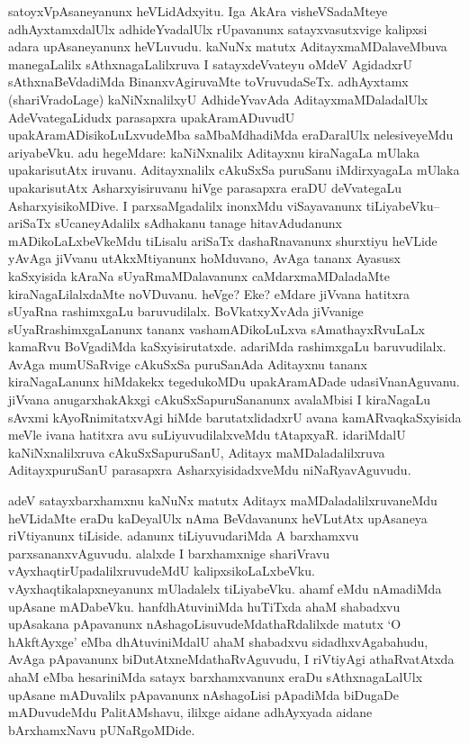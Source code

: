 \begin{artha}
satoyxVpAsaneyanunx heVLidAdxyitu. Iga AkAra visheVSadaMteye adhAyxtamxdalUlx adhideYvadalUlx rUpavanunx satayxvasutxvige kalipxsi adara upAsaneyanunx heVLuvudu. kaNuNx matutx AditayxmaMDalaveMbuva manegaLalilx sAthxnagaLalilxruva I satayxdeVvateyu oMdeV AgidadxrU sAthxnaBeVdadiMda BinanxvAgiruvaMte toVruvudaSeTx. adhAyxtamx (shariVradoLage) kaNiNxnalilxyU AdhideYvavAda AditayxmaMDaladalUlx AdeVvategaLidudx parasapxra upakAramADuvudU upakAramADisikoLuLxvudeMba saMbaMdhadiMda eraDaralUlx nelesiveyeMdu ariyabeVku. adu hegeMdare: kaNiNxnalilx Aditayxnu kiraNagaLa mUlaka upakarisutAtx iruvanu. Aditayxnalilx cAkuSxSa puruSanu iMdirxyagaLa mUlaka upakarisutAtx Asharxyisiruvanu hiVge parasapxra eraDU deVvategaLu AsharxyisikoMDive. I parxsaMgadalilx inonxMdu viSayavanunx tiLiyabeVku-- ariSaTx sUcaneyAdalilx sAdhakanu tanage hitavAdudanunx mADikoLaLxbeVkeMdu tiLisalu ariSaTx dashaRnavanunx shurxtiyu heVLide yAvAga jiVvanu utAkxMtiyanunx hoMduvano, AvAga tananx Ayasusx kaSxyisida kAraNa sUyaRmaMDalavanunx caMdarxmaMDaladaMte kiraNagaLilalxdaMte noVDuvanu. heVge? Eke? eMdare jiVvana hatitxra sUyaRna rashimxgaLu baruvudilalx. BoVkatxyXvAda jiVvanige sUyaRrashimxgaLanunx tananx vashamADikoLuLxva sAmathayxRvuLaLx kamaRvu BoVgadiMda kaSxyisirutatxde. adariMda rashimxgaLu baruvudilalx. AvAga mumUSaRvige cAkuSxSa puruSanAda Aditayxnu tananx kiraNagaLanunx hiMdakekx tegedukoMDu upakAramADade udasiVnanAguvanu. jiVvana anugarxhakAkxgi cAkuSxSapuruSananunx avalaMbisi I kiraNagaLu sAvxmi kAyoRnimitatxvAgi hiMde barutatxlidadxrU avana kamARvaqkaSxyisida meVle ivana hatitxra avu suLiyuvudilalxveMdu tAtapxyaR. idariMdalU kaNiNxnalilxruva cAkuSxSapuruSanU, Aditayx maMDaladalilxruva AditayxpuruSanU parasapxra AsharxyisidadxveMdu niNaRyavAguvudu. 
\end{artha}

\begin{artha}
adeV satayxbarxhamxnu kaNuNx matutx Aditayx maMDaladalilxruvaneMdu heVLidaMte eraDu kaDeyalUlx nAma BeVdavanunx heVLutAtx upAsaneya riVtiyanunx tiLiside. adanunx tiLiyuvudariMda A barxhamxvu parxsananxvAguvudu. alalxde I barxhamxnige shariVravu vAyxhaqtirUpadalilxruvudeMdU kalipxsikoLaLxbeVku. vAyxhaqtikalapxneyanunx mUladalelx tiLiyabeVku. a{ha}mf eMdu nAmadiMda upAsane mADabeVku. hanfdhAtuviniMda huTiTxda ahaM shabadxvu upAsakana pApavanunx nAshagoLisuvudeMdathaRdalilxde matutx `O hAkftAyxge' eMba dhAtuviniMdalU ahaM shabadxvu sidadhxvAgabahudu, AvAga pApavanunx biDutAtxneMdathaRvAguvudu, I riVtiyAgi athaRvatAtxda ahaM eMba hesariniMda satayx barxhamxvanunx eraDu sAthxnagaLalUlx upAsane mADuvalilx pApavanunx nAshagoLisi pApadiMda biDugaDe mADuvudeMdu PalitAMshavu, ililxge aidane adhAyxyada aidane bArxhamxNavu pUNaRgoMDide. 
\end{artha}

